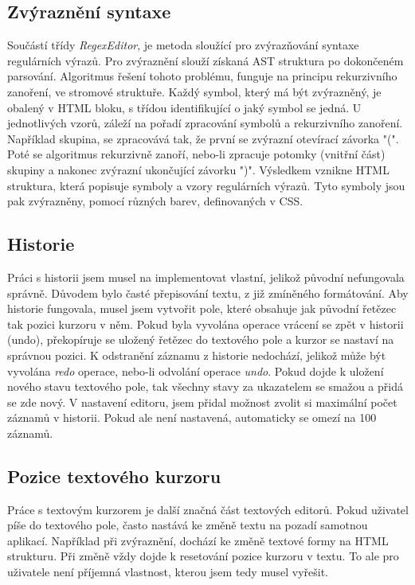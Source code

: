 \subsection*{Zvýraznění syntaxe}

Součástí třídy \textit{RegexEditor}, je metoda sloužící pro zvýrazňování syntaxe regulárních výrazů. 
Pro zvýraznění slouží získaná AST struktura po dokončeném parsování.
Algoritmus řešení tohoto problému, funguje na principu rekurzivního zanoření, ve stromové struktuře.
Každý symbol, který má být zvýrazněný, je obalený v HTML bloku, s třídou identifikující o jaký symbol se jedná.
U jednotlivých vzorů, záleží na pořadí zpracování symbolů a rekurzivního zanoření.
Například skupina, se zpracovává tak, že první se zvýrazní otevírací závorka "(".
Poté se algoritmus rekurzivně zanoří, nebo-li zpracuje potomky (vnitřní část) skupiny a nakonec zvýrazní ukončující závorku ")".
Výsledkem vznikne HTML struktura, která popisuje symboly a vzory regulárních výrazů.
Tyto symboly jsou pak zvýrazněny, pomocí různých barev, definovaných v CSS.

\subsection*{Historie}
Práci s historii jsem musel na implementovat vlastní, jelikož původní nefungovala správně.
Důvodem bylo časté přepisování textu, z již zmíněného formátování.
Aby historie fungovala, musel jsem vytvořit pole, které obsahuje jak původní řetězec tak pozici kurzoru v něm.
Pokud byla vyvolána operace vrácení se zpět v historii (undo), překopíruje se uložený řetězec do textového pole a kurzor se nastaví na správnou pozici.
K odstranění záznamu z historie nedochází, jelikož může být vyvolána \textit{redo} operace, nebo-li odvolání operace \textit{undo}.
Pokud dojde k uložení nového stavu textového pole, tak všechny stavy za ukazatelem se smažou a přidá se zde nový.
V nastavení editoru, jsem přidal možnost zvolit si maximální počet záznamů v historii.
Pokud ale není nastavená, automaticky se omezí na 100 záznamů.

\subsection*{Pozice textového kurzoru}
Práce s textovým kurzorem je další značná část textových editorů.
Pokud uživatel píše do textového pole, často nastává ke změně textu na pozadí samotnou aplikací.
Například při zvýraznění, dochází ke změně textové formy na HTML strukturu.
Při změně vždy dojde k resetování pozice kurzoru v textu.
To ale pro uživatele není příjemná vlastnost, kterou jsem tedy musel vyřešit.

